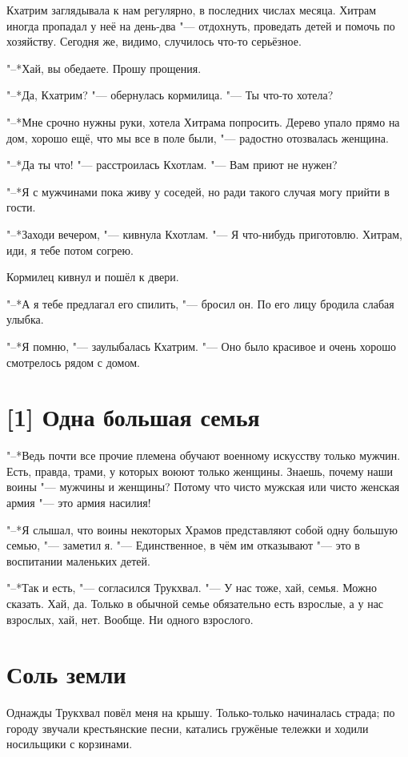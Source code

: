 Кхатрим заглядывала к нам регулярно, в последних числах месяца.
Хитрам иногда пропадал у неё на день-два "--- отдохнуть, проведать детей и помочь по хозяйству.
Сегодня же, видимо, случилось что-то серьёзное.

"--*Хай, вы обедаете.
Прошу прощения.

"--*Да, Кхатрим? "--- обернулась кормилица.
"--- Ты что-то хотела?

"--*Мне срочно нужны руки, хотела Хитрама попросить.
Дерево упало прямо на дом, хорошо ещё, что мы все в поле были, "--- радостно отозвалась женщина.

"--*Да ты что! "--- расстроилась Кхотлам.
"--- Вам приют не нужен?

"--*Я с мужчинами пока живу у соседей, но ради такого случая могу прийти в гости.

"--*Заходи вечером, "--- кивнула Кхотлам.
"--- Я что-нибудь приготовлю.
Хитрам, иди, я тебе потом согрею.

Кормилец кивнул и пошёл к двери.

"--*А я тебе предлагал его спилить, "--- бросил он.
По его лицу бродила слабая улыбка.

"--*Я помню, "--- заулыбалась Кхатрим.
"--- Оно было красивое и очень хорошо смотрелось рядом с домом.

\section{[1] Одна большая семья}

"--*Ведь почти все прочие племена обучают военному искусству только мужчин.
Есть, правда, трами, у которых воюют только женщины.
Знаешь, почему наши воины "--- мужчины и женщины?
Потому что чисто мужская или чисто женская армия "--- это армия насилия!

"--*Я слышал, что воины некоторых Храмов представляют собой одну большую семью, "--- заметил я.
"--- Единственное, в чём им отказывают "--- это в воспитании маленьких детей.

"--*Так и есть, "--- согласился Трукхвал.
"--- У нас тоже, хай, семья.
Можно сказать.
Хай, да.
Только в обычной семье обязательно есть взрослые, а у нас взрослых, хай, нет.
Вообще.
Ни одного взрослого.

\section{Соль земли}

Однажды Трукхвал повёл меня на крышу.
Только-только начиналась страда;
по городу звучали крестьянские песни, катались гружёные тележки и ходили носильщики с корзинами.

